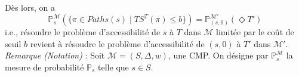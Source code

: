 \documentclass[12pt,a4paper]{report}
\theoremstyle{definition}%
\theoremstyle{remark}
\newtheorem{remark}{Remarque}[chapter]
\newcommand{\ie}{i.e., }
\newcommand{\pr}{\mathbb{P}}
\begin{document}
\begin{itemize}
%
\end{itemize}
 Dès lors, on a \[\pr^\mathcal{M}_s(\{\pi \in Paths(s) \; | \; TS^T(\pi) \leq b \}) = \pr^\mathcal{M'}_{(s, 0)}(\Diamond T')\]
\ie résoudre le problème d'accessibilité de $s$ à $T$ dans $\mathcal{M}$ limitée par le coût de seuil $b$ revient à résoudre le problème d'accessibilité de $(s, 0)$ à $T'$ dans $\mathcal{M'}$. \\
\textit{Remarque (Notation)} : Soit $\mathcal{M} = (S, \Delta, w)$, une CMP. On désigne par $\pr^\mathcal{M}_s$ la mesure de probabilité $\pr_s$ telle que $s \in S$.
\end{document}
